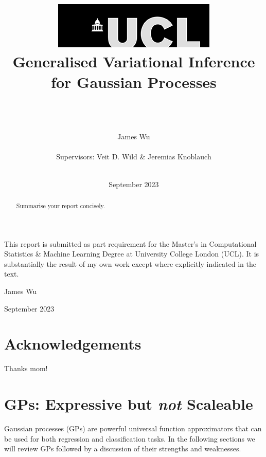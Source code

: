 \documentclass{article}
\title{  	{ \includegraphics[scale=.5]{ucl_logo.png}}\\ 
{{\Huge  Generalised Variational Inference \\ for Gaussian Processes}}\\ 
{ }\\ 
		}
\date{September 2023}
\author{\\ \Large James Wu
\\ \\
Supervisors: Veit D. Wild \& Jeremias Knoblauch
\\ \\ }
\numberwithin{equation}{section}
\begin{document}
\onehalfspacing
\maketitle
{}
\newpage
\setcounter{page}{1}

This report is submitted as part requirement for the Master's in Computational Statistics \& Machine Learning Degree at University College London (UCL). It is substantially the result of my own work except where explicitly indicated in the text.

\begin{flushright}
    James Wu
    
    September 2023
\end{flushright}
\newpage


\section*{Acknowledgements}
Thanks mom!
\newpage

\begin{abstract}
Summarise your report concisely.
\end{abstract}
\newpage
\tableofcontents
\newpage
{}
\setcounter{page}{1}
\section{GPs: Expressive but \textit{not} Scaleable}
Gaussian processes (GPs) are powerful universal function approximators that can be used for both regression and classification tasks. In the following sections we will review GPs followed by a discussion of their strengths and weaknesses.
\end{document}
